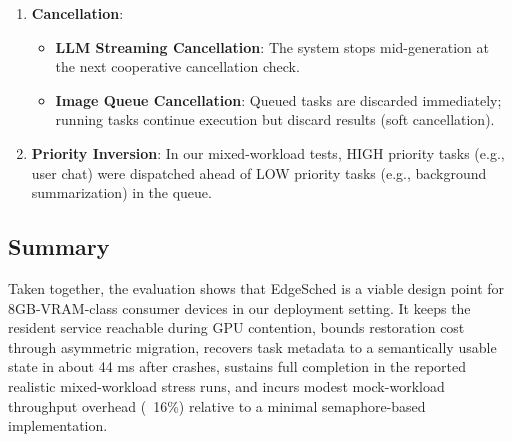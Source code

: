 \begin{enumerate}
\item \textbf{Cancellation}:
\begin{itemize}
\item \textbf{LLM Streaming Cancellation}: The system stops mid-generation at the next cooperative cancellation check.
\item \textbf{Image Queue Cancellation}: Queued tasks are discarded immediately; running tasks continue execution but discard results (soft cancellation).
\end{itemize}

\item \textbf{Priority Inversion}: In our mixed-workload tests, HIGH priority tasks (e.g., user chat) were dispatched ahead of LOW priority tasks (e.g., background summarization) in the queue.
\end{enumerate}

\subsection{Summary}

Taken together, the evaluation shows that EdgeSched is a viable design point for 8GB-VRAM-class consumer devices in our deployment setting. It keeps the resident service reachable during GPU contention, bounds restoration cost through asymmetric migration, recovers task metadata to a semantically usable state in about 44 ms after crashes, sustains full completion in the reported realistic mixed-workload stress runs, and incurs modest mock-workload throughput overhead (~16\%) relative to a minimal semaphore-based implementation.
